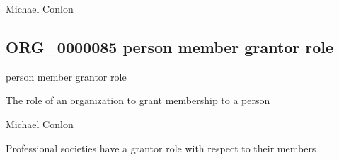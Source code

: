 \documentclass[letterpaper,10pt,english]{sphinxmanual}
\begin{document}
\begin{sphinxShadowBox}

\sphinxAtStartPar
Michael Conlon 
\end{sphinxShadowBox}
\begin{quote}

\ignorespaces \end{quote}


\subsection{ORG\_0000085 \sphinxhyphen{} person member grantor role}
\label{\detokenize{doc-ORG_0000085:org-0000085-person-member-grantor-role}}\label{\detokenize{doc-ORG_0000085:index-0}}\label{\detokenize{doc-ORG_0000085::doc}}
\begin{sphinxShadowBox}

\sphinxAtStartPar
person member grantor role
\end{sphinxShadowBox}

\begin{sphinxShadowBox}

\sphinxAtStartPar
{\hyperref[\detokenize{doc-BFO_0000023::doc}]{}}
\end{sphinxShadowBox}

\begin{sphinxShadowBox}

\sphinxAtStartPar
The role of an organization to grant membership to a person
\end{sphinxShadowBox}

\begin{sphinxShadowBox}

\sphinxAtStartPar
Michael Conlon 
\end{sphinxShadowBox}

\begin{sphinxShadowBox}

\sphinxAtStartPar
Professional societies have a grantor role with respect to their members
\end{sphinxShadowBox}
\end{document}
